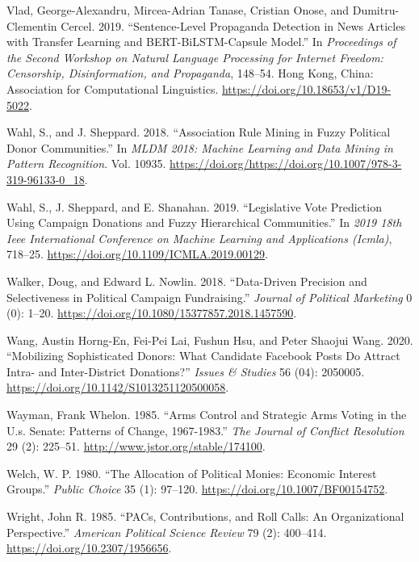 \documentclass[12pt,]{article}
\begin{document}
\leavevmode\hypertarget{ref-vlad2019}{}%
Vlad, George-Alexandru, Mircea-Adrian Tanase, Cristian Onose, and
Dumitru-Clementin Cercel. 2019. ``Sentence-Level Propaganda Detection in
News Articles with Transfer Learning and BERT-BiLSTM-Capsule Model.'' In
\emph{Proceedings of the Second Workshop on Natural Language Processing
for Internet Freedom: Censorship, Disinformation, and Propaganda},
148--54. Hong Kong, China: Association for Computational Linguistics.
\url{https://doi.org/10.18653/v1/D19-5022}.

\leavevmode\hypertarget{ref-wahl2018}{}%
Wahl, S., and J. Sheppard. 2018. ``Association Rule Mining in Fuzzy
Political Donor Communities.'' In \emph{MLDM 2018: Machine Learning and
Data Mining in Pattern Recognition}. Vol. 10935.
\url{https://doi.org/https://doi.org/10.1007/978-3-319-96133-0_18}.

\leavevmode\hypertarget{ref-wahl2019}{}%
Wahl, S., J. Sheppard, and E. Shanahan. 2019. ``Legislative Vote
Prediction Using Campaign Donations and Fuzzy Hierarchical
Communities.'' In \emph{2019 18th Ieee International Conference on
Machine Learning and Applications (Icmla)}, 718--25.
\url{https://doi.org/10.1109/ICMLA.2019.00129}.

\leavevmode\hypertarget{ref-walker2018}{}%
Walker, Doug, and Edward L. Nowlin. 2018. ``Data-Driven Precision and
Selectiveness in Political Campaign Fundraising.'' \emph{Journal of
Political Marketing} 0 (0): 1--20.
\url{https://doi.org/10.1080/15377857.2018.1457590}.

\leavevmode\hypertarget{ref-wang2020}{}%
Wang, Austin Horng-En, Fei-Pei Lai, Fushun Hsu, and Peter Shaojui Wang.
2020. ``Mobilizing Sophisticated Donors: What Candidate Facebook Posts
Do Attract Intra- and Inter-District Donations?'' \emph{Issues \&
Studies} 56 (04): 2050005.
\url{https://doi.org/10.1142/S1013251120500058}.

\leavevmode\hypertarget{ref-wayman1985}{}%
Wayman, Frank Whelon. 1985. ``Arms Control and Strategic Arms Voting in
the U.s. Senate: Patterns of Change, 1967-1983.'' \emph{The Journal of
Conflict Resolution} 29 (2): 225--51.
\url{http://www.jstor.org/stable/174100}.

\leavevmode\hypertarget{ref-welch1980}{}%
Welch, W. P. 1980. ``The Allocation of Political Monies: Economic
Interest Groups.'' \emph{Public Choice} 35 (1): 97--120.
\url{https://doi.org/10.1007/BF00154752}.

\leavevmode\hypertarget{ref-wright1985}{}%
Wright, John R. 1985. ``PACs, Contributions, and Roll Calls: An
Organizational Perspective.'' \emph{American Political Science Review}
79 (2): 400--414. \url{https://doi.org/10.2307/1956656}.
\end{document}
